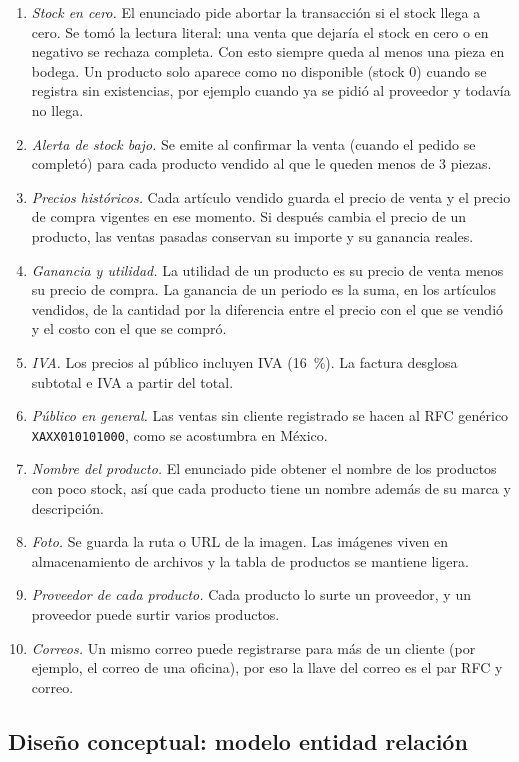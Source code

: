 \documentclass[12pt,a4paper]{article}
\newcommand{\cod}[1]{{\ttfamily\nolinkurl{#1}}}
\begin{document}
\begin{enumerate}[leftmargin=1.2cm, itemsep=0.25em]
\item \textit{Stock en cero.} El enunciado pide abortar la transacción si el stock
llega a cero. Se tomó la lectura literal: una venta que dejaría el stock en cero o
en negativo se rechaza completa. Con esto siempre queda al menos una pieza en
bodega. Un producto solo aparece como no disponible (stock 0) cuando se registra
sin existencias, por ejemplo cuando ya se pidió al proveedor y todavía no llega.
\item \textit{Alerta de stock bajo.} Se emite al confirmar la venta (cuando el
pedido se completó) para cada producto vendido al que le queden menos de 3 piezas.
\item \textit{Precios históricos.} Cada artículo vendido guarda el precio de venta y
el precio de compra vigentes en ese momento. Si después cambia el precio de un
producto, las ventas pasadas conservan su importe y su ganancia reales.
\item \textit{Ganancia y utilidad.} La utilidad de un producto es su precio de venta
menos su precio de compra. La ganancia de un periodo es la suma, en los artículos
vendidos, de la cantidad por la diferencia entre el precio con el que se vendió y
el costo con el que se compró.
\item \textit{IVA.} Los precios al público incluyen IVA (16~\%). La factura desglosa
subtotal e IVA a partir del total.
\item \textit{Público en general.} Las ventas sin cliente registrado se hacen al RFC
genérico \cod{XAXX010101000}, como se acostumbra en México.
\item \textit{Nombre del producto.} El enunciado pide obtener el nombre de los
productos con poco stock, así que cada producto tiene un nombre además de su
marca y descripción.
\item \textit{Foto.} Se guarda la ruta o URL de la imagen. Las imágenes viven en
almacenamiento de archivos y la tabla de productos se mantiene ligera.
\item \textit{Proveedor de cada producto.} Cada producto lo surte un proveedor, y un
proveedor puede surtir varios productos.
\item \textit{Correos.} Un mismo correo puede registrarse para más de un cliente (por
ejemplo, el correo de una oficina), por eso la llave del correo es el par RFC y
correo.
\end{enumerate}

\subsection{Diseño conceptual: modelo entidad relación}
\end{document}
